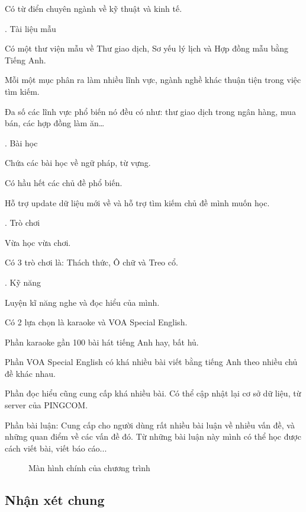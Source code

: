 Có từ điển chuyên ngành về kỹ thuật và kinh tế.

. Tài liệu mẫu

Có một thư viện mẫu về Thư giao dịch, Sơ yếu lý lịch và Hợp đồng mẫu bằng Tiếng Anh.

Mỗi một mục phân ra làm nhiều lĩnh vực, ngành nghề khác thuận tiện trong việc tìm kiếm.

Đa số các lĩnh vực phổ biến nó đều có như: thư giao dịch trong ngân hàng, mua bán, các hợp đồng làm ăn…

. Bài học

Chứa các bài học về ngữ pháp, từ vựng.

Có hầu hết các chủ đề phổ biến.

Hỗ trợ update dữ liệu mới về và hỗ trợ tìm kiếm chủ đề mình muốn học.

. Trò chơi

Vừa học vừa chơi.

Có 3 trò chơi là: Thách thức, Ô chữ và Treo cổ.

. Kỹ năng

Luyện kĩ năng nghe và đọc hiểu của mình.

Có 2 lựa chọn là karaoke và VOA Special English.

Phần karaoke gần 100 bài hát tiếng Anh hay, bất hủ.

Phần VOA Special English có khá nhiều bài viết bằng tiếng Anh theo nhiều chủ đề khác nhau.

Phần đọc hiểu cũng cung cấp khá nhiều bài. Có thể cập nhật lại cơ sở dữ liệu, từ server của PINGCOM.

Phần bài luận: Cung cấp cho người dùng rất nhiều bài luận về nhiều vấn đề, và những quan điểm về các vấn đề đó. Từ những bài luận này mình có thể học được cách viết bài, viết báo cáo...


\begin{figure}[!h] 
\centering
{}
\caption{Màn hình chính của chương trình }
\end{figure}

\subsection{Nhận xét chung}

